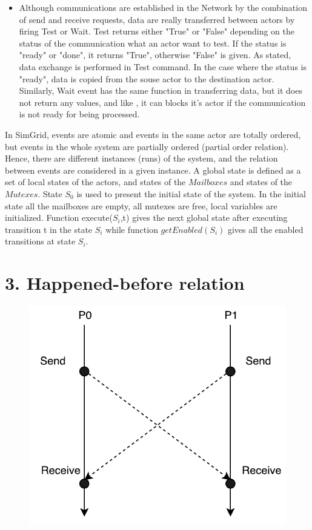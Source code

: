 \documentclass[a4paper,11pt]{article}
\begin{document}
\begin{itemize}[noitemsep]
\begin{itemize}[noitemsep]
\item Although communications are established in the Network by the combination of send and receive requests, data are really transferred between actors by firing Test or Wait. Test returns either "True" or "False" depending on the status of the communication what an actor want to test. If the status is "ready" or "done", it returns "True", otherwise "False" is given. As stated, data exchange is performed in Test command. In the case where the status is "ready", data is copied from the souse actor to the destination actor. Similarly, Wait event has the same function in transferring data, but  it does not return any values, and like \mutexwait, it can blocks it's actor if the communication is not ready for being processed.   
\end{itemize}
In SimGrid, events are atomic and events in the same actor are totally ordered, but events in the whole system are partially ordered (partial order relation).  Hence, there are different instances (runs) of the system, and the relation between events are  considered in a given instance. A global state is defined as a set of local states of the actors, and states of the $Mailboxes$ and states of the $Mutexes$. State $S_0$ is used to present the initial state of the system. In the initial state all the mailboxes are empty, all mutexes are free, local variables are initialized. Function execute($S_i$,t)  gives the next global state after executing transition t in the state $S_i$ while function $getEnabled(S_i)$
gives all the enabled transitions at state $S_i$.
\section*{3. Happened-before relation}
\begin{figure}[H]
	\label{fig:cycle_dependency}
	\begin{center}
		\centerline{\includegraphics[scale=.8]{example.pdf}}


\end{center}
\end{figure}
\end{itemize}
\end{document}
